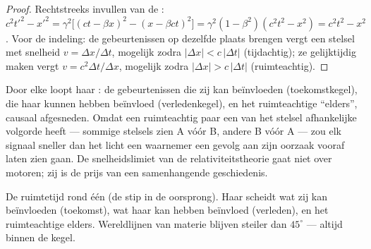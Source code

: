 \begin{proof}
Rechtstreeks invullen van de :
$c^2t'^2 - x'^2 = \gamma^2\big[(ct - \beta x)^2 - (x - \beta ct)^2
\big] = \gamma^2(1 - \beta^2)(c^2t^2 - x^2) = c^2t^2 - x^2$.
Voor de indeling: de gebeurtenissen op dezelfde plaats brengen vergt een
stelsel met snelheid $v = \Delta x/\Delta t$, mogelijk zodra $|\Delta x| <
c\,|\Delta t|$ (tijdachtig); ze gelijktijdig maken vergt $v =
c^2\Delta t/\Delta x$, mogelijk zodra $|\Delta x| > c\,|\Delta t|$
(ruimteachtig).
\end{proof}

\begin{remark}\label{rem:b3:relativistic-kinematics:causality}
Door elke  loopt haar \emph{}: de gebeurtenissen die
zij kan beïnvloeden (toekomstkegel), die haar kunnen hebben beïnvloed
(verledenkegel), en het ruimteachtige ``elders'', causaal afgesneden.
Omdat een ruimteachtig paar een van het stelsel afhankelijke volgorde
heeft --- sommige stelsels zien A vóór B, andere B vóór A --- zou elk
signaal sneller dan het licht een waarnemer een gevolg aan zijn oorzaak
vooraf laten zien gaan. De snelheidslimiet van de relativiteitstheorie
gaat niet over motoren; zij is de prijs van een samenhangende
geschiedenis.
\end{remark}

\begin{omfigure}

{\small De ruimtetijd rond één  (de stip in de oorsprong). Haar
 scheidt wat zij kan beïnvloeden (toekomst), wat haar kan
hebben beïnvloed (verleden), en het ruimteachtige elders. Wereldlijnen
van materie blijven steiler dan $45^\circ$ --- altijd binnen de kegel.}
\end{omfigure}


